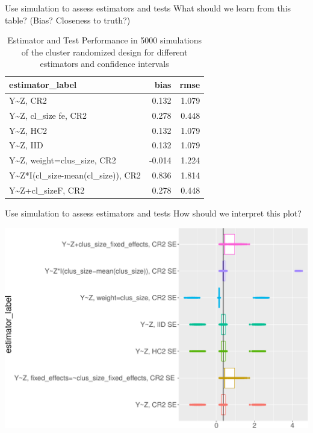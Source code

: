 \documentclass[
  ignorenonframetext,
]{beamer}
\begin{document}
\begin{frame}{Use simulation to assess estimators and tests}
\protect\hypertarget{use-simulation-to-assess-estimators-and-tests-1}{}
What should we learn from this table? (Bias? Closeness to truth?)

\scriptsize

\begin{table}

\caption{\label{tab:showresclus2}Estimator and Test Performance in 5000 simulations of the cluster randomized design for different estimators and confidence intervals}
\centering
\begin{tabular}[t]{lrr}
\toprule
estimator\_label & bias & rmse\\
\midrule
Y\textasciitilde{}Z, CR2 & 0.132 & 1.079\\
Y\textasciitilde{}Z, cl\_size fe, CR2 & 0.278 & 0.448\\
Y\textasciitilde{}Z, HC2 & 0.132 & 1.079\\
Y\textasciitilde{}Z, IID & 0.132 & 1.079\\
Y\textasciitilde{}Z, weight=clus\_size, CR2 & -0.014 & 1.224\\
Y\textasciitilde{}Z*I(cl\_size-mean(cl\_size)), CR2 & 0.836 & 1.814\\
Y\textasciitilde{}Z+cl\_sizeF, CR2 & 0.278 & 0.448\\
\bottomrule
\end{tabular}
\end{table}

\normalsize
\end{frame}

\begin{frame}{Use simulation to assess estimators and tests}
\protect\hypertarget{use-simulation-to-assess-estimators-and-tests-2}{}
How should we interpret this plot?

\scriptsize

\includegraphics[width=.95\textwidth,]{figs/figsim_plot_clus-1}
\normalsize
\end{frame}
\end{document}
